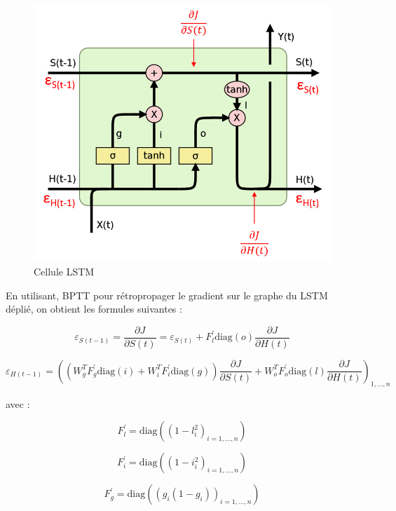 \documentclass{report}
\theoremstyle{plain}
\theoremstyle{definition}
\theoremstyle{remark}
\begin{document}
\begin{figure}[h!]
\begin{center}
\includegraphics[scale=0.3]{images/LSTM_gradient.png}
\caption{Cellule LSTM}
\label{cellule LSTM gradient}
\end{center}
\end{figure}


En utilisant, BPTT pour rétropropager le gradient sur le graphe du LSTM déplié, on obtient les formules suivantes :

\begin{equation}
\varepsilon_{S(t-1)} = \frac{\partial J}{\partial S(t)} = \varepsilon_{S(t)} + F_{l}^{\prime}\text{diag}(o)\frac{\partial J}{\partial H(t)}
\end{equation}

\begin{equation}
\varepsilon_{H(t-1)} = \left((W_{g}^{T}F_{g}^{\prime}\text{diag}(i) + W_{i}^{T}F_{i}^{\prime}\text{diag}(g))\frac{\partial J}{\partial S(t)} + W_{o}^{T}F_{o}^{\prime}\text{diag}(l)\frac{\partial J}{\partial H(t)}\right)_{1,...,n}
\end{equation}

avec :

\[
F_{l}^{\prime} = \text{diag}((1 - l_{i}^{2})_{i=1,...,n})
\]

\[
F_{i}^{\prime} = \text{diag}((1 - i_{i}^{2})_{i=1,...,n})
\]

\[
F_{g}^{\prime} = \text{diag}((g_{i}(1 - g_{i}))_{i=1,...,n})
\]
\end{document}

